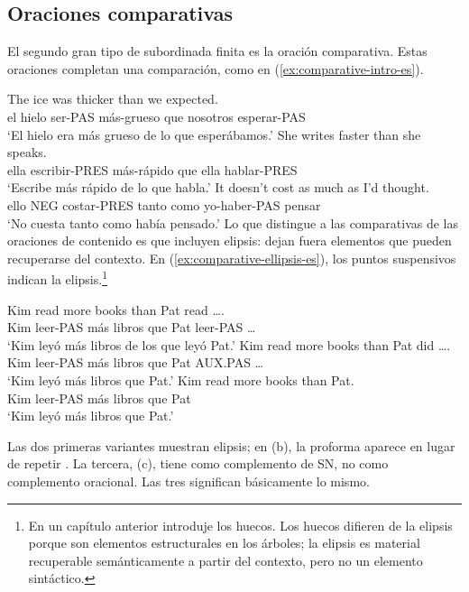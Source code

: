 \subsection{Oraciones comparativas}

El segundo gran tipo de subordinada finita es la oración comparativa. Estas oraciones completan una comparación, como en (\ref{ex:comparative-intro-es}).

\ea \label{ex:comparative-intro-es}
    \ea \gll The ice was thicker than {\ob}we expected{\cb}.\\
        el hielo ser-PAS más-grueso que nosotros esperar-PAS\\
    \glt `El hielo era más grueso de lo que esperábamos.'
    \ex \gll She writes faster than {\ob}she speaks{\cb}.\\
        ella escribir-PRES más-rápido que ella hablar-PRES\\
    \glt `Escribe más rápido de lo que habla.'
    \ex \gll It doesn't cost as much as {\ob}I'd thought{\cb}.\\
        ello NEG costar-PRES tanto como yo-haber-PAS pensar\\
    \glt `No cuesta tanto como había pensado.'
    \z
\z
Lo que distingue a las comparativas de las oraciones de contenido es que incluyen elipsis: dejan fuera elementos que pueden recuperarse del contexto. En (\ref{ex:comparative-ellipsis-es}), los puntos suspensivos indican la elipsis.\footnote{En un capítulo anterior introduje los huecos. Los huecos difieren de la elipsis porque son elementos estructurales en los árboles; la elipsis es material recuperable semánticamente a partir del contexto, pero no un elemento sintáctico.}

\ea \label{ex:comparative-ellipsis-es}
    \ea \gll Kim read more books than {\ob}Pat read \dots{\cb}.\\
        Kim leer-PAS más libros que Pat leer-PAS \dots\\
    \glt `Kim leyó más libros de los que leyó Pat.'
    \ex \gll Kim read more books than {\ob}Pat did \dots{\cb}.\\
        Kim leer-PAS más libros que Pat AUX.PAS \dots\\
    \glt `Kim leyó más libros que Pat.'
    \ex \gll Kim read more books than {\ob}Pat{\cb}.\\
        Kim leer-PAS más libros que Pat\\
    \glt `Kim leyó más libros que Pat.'
    \z
\z

Las dos primeras variantes muestran elipsis; en (b), la proforma  aparece en lugar de repetir . La tercera, (c), tiene  como complemento de SN, no como complemento oracional. Las tres significan básicamente lo mismo.

